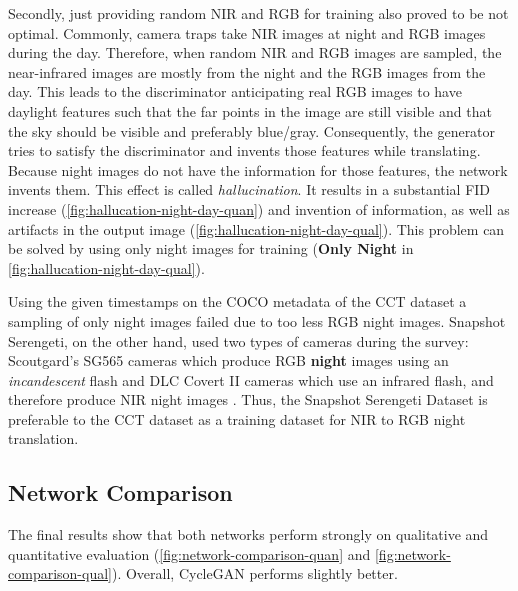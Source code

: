 \documentclass[a4paper,11pt, DIV=12]{scrartcl}
\begin{document}
Secondly, just providing random NIR and RGB for training also proved to be not optimal.
Commonly, camera traps take NIR images at night and RGB images during the day.
Therefore, when random NIR and RGB images are sampled, the near-infrared images are mostly from the night and the RGB images from the day.
This leads to the discriminator anticipating real RGB images to have daylight features such that the far points in the image are still visible and that the sky should be visible and preferably blue/gray.
Consequently, the generator tries to satisfy the discriminator and invents those features while translating.
Because night images do not have the information for those features, the network invents them.
This effect is called \textit{hallucination}. It results in a substantial FID increase (\autoref{fig:hallucation-night-day-quan}) and invention of information, as
well as artifacts in the output image (\autoref{fig:hallucation-night-day-qual}).
This problem can be solved by using only night images for training (\textbf{Only Night} in \autoref{fig:hallucation-night-day-qual}).

Using the given timestamps on the COCO metadata of the CCT dataset \cite{caltech} a sampling of only night images failed due to too less RGB night images.
Snapshot Serengeti, on the other hand, used two types of cameras during the survey:
Scoutgard's SG565 cameras which produce RGB \textbf{night} images using an \textit{incandescent} flash and
DLC Covert II cameras which use an infrared flash, and therefore produce NIR night images \cite{serengeti}.
Thus, the Snapshot Serengeti Dataset is preferable to the CCT dataset as a training dataset for NIR to RGB night translation.

\subsection{Network Comparison}
The final results show that both networks perform strongly on qualitative and quantitative evaluation (\autoref{fig:network-comparison-quan} and \autoref{fig:network-comparison-qual}). Overall, CycleGAN performs slightly better.
\end{document}
